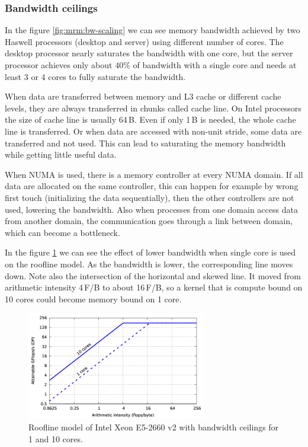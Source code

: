 \subsubsection*{Bandwidth ceilings}


In the figure \ref{fig:mrm:bw-scaling} we can see memory bandwidth achieved by two Haswell processors (desktop and server) using different number of cores. The desktop processor nearly saturates the bandwidth with one core, but the server processor achieves only about 40\% of bandwidth with a single core and needs at least 3 or 4 cores to fully saturate the bandwidth.

When data are transferred between memory and L3 cache or different cache levels, they are always transferred in chunks called cache line. On Intel processors the size of cache line is usually 64\,B. Even if only 1\,B is needed, the whole cache line is transferred. Or when data are accessed with non-unit stride, some data are transferred and not used. This can lead to saturating the memory bandwidth while getting little useful data.

When NUMA is used, there is a memory controller at every NUMA domain. If all data are allocated on the same controller, this can happen for example by wrong first touch (initializing the data sequentially), then the other controllers are not used, lowering the bandwidth. Also when processes from one domain access data from another domain, the communication goes through a link between domain, which can become a bottleneck.

In the figure \ref{fig:roofline_emmy_memory-ceilings} we can see the effect of lower bandwidth when single core is used on the roofline model. As the bandwidth is lower, the corresponding line moves down. Note also the intersection of the horizontal and skewed line. It moved from arithmetic intensity 4\,F/B to about 16\,F/B, so a kernel that is compute bound on 10 cores could become memory bound on 1 core.

\begin{figure}[ht]
   \centering
   \includegraphics[width=0.7\textwidth,clip=true]{images/roofline/roofline_emmy_Xeon2660v2_memory-ceilings.pdf}
   \caption{Roofline model of Intel Xeon E5-2660 v2 with bandwidth ceilings for 1 and 10 cores.}
  \label{fig:roofline_emmy_memory-ceilings}
\end{figure}

